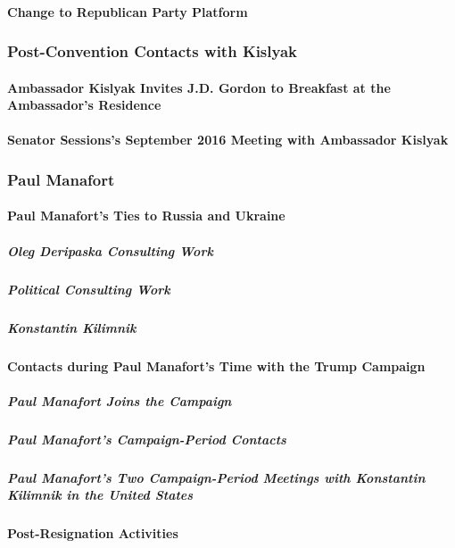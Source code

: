 \paragraph{Change to Republican Party Platform}

\subsubsection{Post-Convention Contacts with Kislyak}

\paragraph{Ambassador Kislyak Invites J.D. Gordon to Breakfast at the Ambassador's Residence}

\paragraph{Senator Sessions's September 2016 Meeting with Ambassador Kislyak}

\subsubsection{Paul Manafort}

\paragraph{Paul Manafort's Ties to Russia and Ukraine}

\subparagraph{Oleg Deripaska Consulting Work}

\subparagraph{Political Consulting Work}

\subparagraph{Konstantin Kilimnik}

\paragraph{Contacts during Paul Manafort's Time with the Trump Campaign}

\subparagraph{Paul Manafort Joins the Campaign}

\subparagraph{Paul Manafort's Campaign-Period Contacts}

\subparagraph{Paul Manafort's Two Campaign-Period Meetings with Konstantin Kilimnik in the United States}

\paragraph{Post-Resignation Activities}

